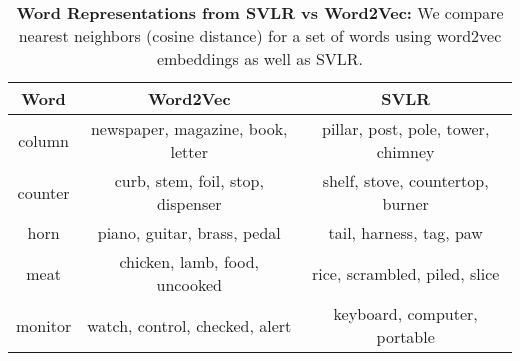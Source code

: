 \vspace{-3mm}
\begin{table}[t]
\scriptsize
    \centering
    \setlength\tabcolsep{2pt}
    \begin{tabular}{|c|c|c|}
    \hline
    Word & Word2Vec & SVLR \\
    \hline
    column & newspaper, magazine, book, letter & pillar, post, pole, tower, chimney \\
    counter & curb, stem, foil, stop, dispenser & shelf, stove, countertop, burner \\
    horn & piano, guitar, brass, pedal & tail, harness, tag, paw \\
    meat & chicken, lamb, food, uncooked & rice, scrambled, piled, slice \\
    monitor & watch, control, checked, alert & keyboard, computer, portable \\
    \hline
    \end{tabular}
    \vspace{-2mm}
    \caption{\textbf{Word Representations from SVLR vs Word2Vec:} We compare nearest neighbors (cosine distance) for a set of words using word2vec embeddings as well as SVLR.}
    \label{Tbl:embeddingexamples}
    \vspace{-3mm}
\end{table}